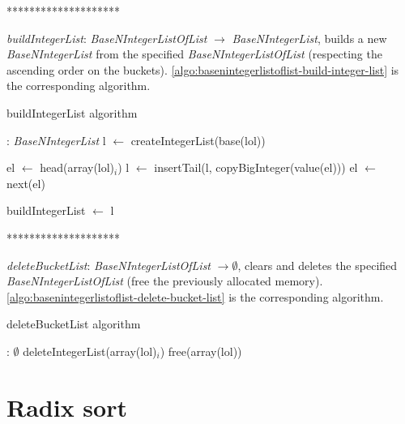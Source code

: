 \documentclass[book, nodocumentinfo]{upmethodology-document}
\newcommand{\separator}{\centerline{********************}}
\begin{document}
\separator

\emph{buildIntegerList}: \emph{BaseNIntegerListOfList} \(\rightarrow\) \emph{BaseNIntegerList},
builds a new \emph{BaseNIntegerList} from the specified \emph{BaseNIntegerListOfList}
(respecting the ascending order on the buckets).
\ref{algo:basenintegerlistoflist-build-integer-list} is the corresponding algorithm.

\begin{algorithm}[H]
    \caption{buildIntegerList algorithm}
    \label{algo:basenintegerlistoflist-build-integer-list}

    \begin{algorithmic}
         : \emph{BaseNIntegerList}
            \State l \(\leftarrow\) createIntegerList(base(lol))

                \State el \(\leftarrow\) head(array(lol)\(_i\))
                \State l \(\leftarrow\) insertTail(l, copyBigInteger(value(el)))
                    \State el \(\leftarrow\) next(el)
                \EndWhile
            \EndFor

            \State buildIntegerList \(\leftarrow\) l
        \EndFunction
    \end{algorithmic}
\end{algorithm}

\separator

\emph{deleteBucketList}: \emph{BaseNIntegerListOfList} \(\rightarrow \emptyset\),
clears and deletes the specified \emph{BaseNIntegerListOfList} (free the previously allocated
memory).
\ref{algo:basenintegerlistoflist-delete-bucket-list} is the corresponding algorithm.

\begin{algorithm}[H]
    \caption{deleteBucketList algorithm}
    \label{algo:basenintegerlistoflist-delete-bucket-list}

    \begin{algorithmic}
         : \(\emptyset\)
                \State deleteIntegerList(array(lol)\(_i\))
            \EndFor
            \State free(array(lol))
        \EndFunction
    \end{algorithmic}
\end{algorithm}

\newpage

\section{Radix sort}
\end{document}
